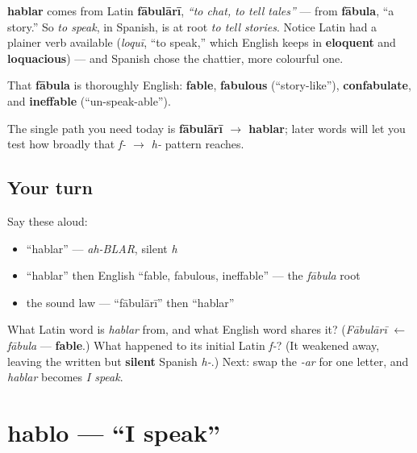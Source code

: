 \begin{cousinweb}
\textbf{hablar} comes from Latin \textbf{fābulārī}, \emph{\textquotedblleft{}to chat, to tell tales\textquotedblright{}} — from \textbf{fābula}, \textquotedblleft{}a story.\textquotedblright{} So \emph{to speak}, in Spanish, is at root \emph{to tell stories}. Notice Latin had a plainer verb available (\emph{loquī}, \textquotedblleft{}to speak,\textquotedblright{} which English keeps in \textbf{eloquent} and \textbf{loquacious}) — and Spanish chose the chattier, more colourful one.

That \textbf{fābula} is thoroughly English: \textbf{fable}, \textbf{fabulous} (\textquotedblleft{}story-like\textquotedblright{}), \textbf{confabulate}, and \textbf{ineffable} (\textquotedblleft{}un-speak-able\textquotedblright{}).

The single path you need today is \textbf{fābulārī $\to$ hablar}; later words will let you test how broadly that \emph{f- $\to$ h-} pattern reaches.
\end{cousinweb}

\subsection*{Your turn}
Say these aloud:

\begin{itemize}
\raggedright
  \item \textquotedblleft{}hablar\textquotedblright{} — \emph{ah-BLAR}, silent \emph{h}
  \item \textquotedblleft{}hablar\textquotedblright{} then English \textquotedblleft{}fable, fabulous, ineffable\textquotedblright{} — the \emph{fābula} root
  \item the sound law — \textquotedblleft{}fābulārī\textquotedblright{} then \textquotedblleft{}hablar\textquotedblright{}
\end{itemize}

\begin{tcolorbox}[breakable,colback=teal!4,colframe=teal!35!black,title={Before you move on}]
What Latin word is \emph{hablar} from, and what English word shares it? (\emph{Fābulārī} $\leftarrow$ \emph{fābula} — \textbf{fable}.) What happened to its initial Latin \emph{f-}? (It weakened away, leaving the written but \textbf{silent} Spanish \emph{h-}.) Next: swap the \emph{-ar} for one letter, and \emph{hablar} becomes \emph{I speak}.
\end{tcolorbox}
\section[hablo]{hablo — \textquotedblleft{}I speak\textquotedblright{}}


